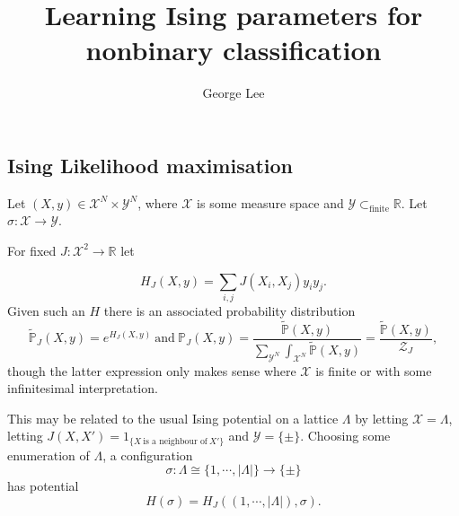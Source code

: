 \documentclass[10pt,a4paper]{article}
\title{Learning Ising parameters for nonbinary classification}
\author{George Lee}
\begin{document}
\maketitle
\subsection*{Ising Likelihood maximisation}
Let $(X,y)\in\mathcal X^N\times\mathcal Y^N$, where $\mathcal X$ is some measure space and $\mathcal Y\subset_\text{finite}\mathbb R$.
Let $\sigma:\mathcal X\rightarrow\mathcal Y$.

For fixed $J:\mathcal X^2\rightarrow\mathbb R$ let

$$
H_J(X,y)=\sum_{i,j}J(X_i,X_j)y_iy_j.
$$
Given such an $H$ there is an associated probability distribution
$$
\widetilde{\mathbb P}_J(X,y)=e^{H_J(X,y)}~\text{and}~\mathbb P_J(X,y)=\frac{\widetilde{\mathbb P}(X,y)}{\sum_{\mathcal Y^N}\int_{\mathcal X^N}{\widetilde{\mathbb P}(X,y)}}=\frac{\widetilde{\mathbb P}(X,y)}{\mathcal Z_J},
$$
though the latter expression only makes sense where $\mathcal X$ is finite or with some infinitesimal interpretation.

This may be related to the usual Ising potential on a lattice $\Lambda$ by letting $\mathcal X=\Lambda$, letting $J(X,X')=1_{\{X~\text{is a neighbour of}~X'\}}$ and $\mathcal Y=\{\pm\}$.
Choosing some enumeration of $\Lambda$, a configuration
$$
\sigma:\Lambda\cong\{1,\cdots,|\Lambda|\}\rightarrow\{\pm\}
$$
has potential
$$
H(\sigma)=H_J\left((1,\cdots,|\Lambda|),\sigma\right).
$$



\end{document}
